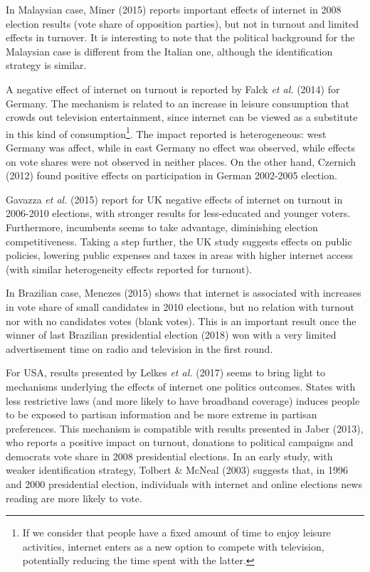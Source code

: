 \documentclass[
  12pt,
]{article}
\begin{document}
In Malaysian case, Miner (2015) reports important effects of internet in
2008 election results (vote share of opposition parties), but not in
turnout and limited effects in turnover. It is interesting to note that
the political background for the Malaysian case is different from the
Italian one, although the identification strategy is similar.

A negative effect of internet on turnout is reported by Falck \emph{et
al.} (2014) for Germany. The mechanism is related to an increase in
leisure consumption that crowds out television entertainment, since
internet can be viewed as a substitute in this kind of
consumption\footnote{If we consider that people have a fixed amount of
  time to enjoy leisure activities, internet enters as a new option to
  compete with television, potentially reducing the time spent with the
  latter.}. The impact reported is heterogeneous: west Germany was
affect, while in east Germany no effect was observed, while effects on
vote shares were not observed in neither places. On the other hand,
Czernich (2012) found positive effects on participation in German
2002-2005 election.

Gavazza \emph{et al.} (2015) report for UK negative effects of internet
on turnout in 2006-2010 elections, with stronger results for
less-educated and younger voters. Furthermore, incumbents seems to take
advantage, diminishing election competitiveness. Taking a step further,
the UK study suggests effects on public policies, lowering public
expenses and taxes in areas with higher internet access (with similar
heterogeneity effects reported for turnout).

In Brazilian case, Menezes (2015) shows that internet is associated with
increases in vote share of small candidates in 2010 elections, but no
relation with turnout nor with no candidates votes (blank votes). This
is an important result once the winner of last Brazilian presidential
election (2018) won with a very limited advertisement time on radio and
television in the first round.

For USA, results presented by Lelkes \emph{et al.} (2017) seems to bring
light to mechanisms underlying the effects of internet one politics
outcomes. States with less restrictive laws (and more likely to have
broadband coverage) induces people to be exposed to partisan information
and be more extreme in partisan preferences. This mechanism is
compatible with results presented in Jaber (2013), who reports a
positive impact on turnout, donations to political campaigns and
democrats vote share in 2008 presidential elections. In an early study,
with weaker identification strategy, Tolbert \& McNeal (2003) suggests
that, in 1996 and 2000 presidential election, individuals with internet
and online elections news reading are more likely to vote.
\end{document}
